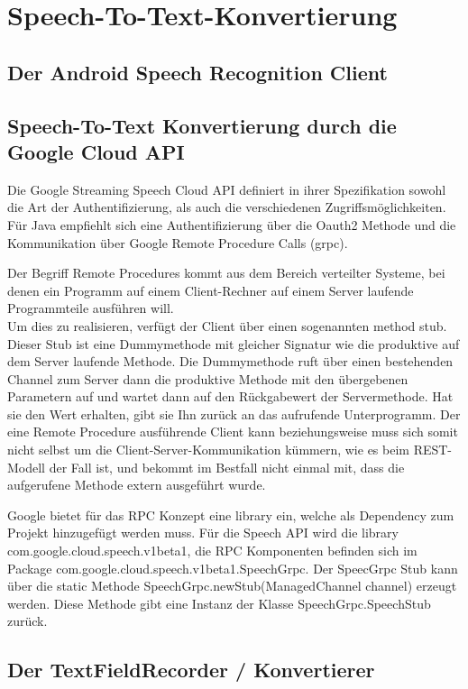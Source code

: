 \chapter{Speech-To-Text-Konvertierung}
\section{Der Android Speech Recognition Client}
\section{Speech-To-Text Konvertierung durch die Google Cloud API}
Die Google Streaming Speech Cloud API definiert in ihrer Spezifikation sowohl die Art der Authentifizierung, als auch die verschiedenen Zugriffsmöglichkeiten. Für Java empfiehlt sich eine Authentifizierung über die Oauth2 Methode und die Kommunikation über Google Remote Procedure Calls (grpc).\par
 Der Begriff Remote Procedures kommt aus dem Bereich verteilter Systeme, bei denen ein Programm auf einem Client-Rechner auf einem Server laufende Programmteile ausführen will.\\
Um dies zu realisieren, verfügt der Client über einen sogenannten method stub. Dieser Stub ist eine Dummymethode mit gleicher Signatur wie die produktive auf dem Server laufende Methode. Die Dummymethode ruft über einen bestehenden Channel zum Server dann die produktive Methode mit den übergebenen Parametern auf und wartet dann auf den Rückgabewert der Servermethode. Hat sie den Wert erhalten, gibt sie Ihn zurück an das aufrufende Unterprogramm. Der eine Remote Procedure ausführende Client kann beziehungsweise muss sich somit nicht selbst um die Client-Server-Kommunikation kümmern, wie es beim REST-Modell der Fall ist, und bekommt im Bestfall nicht einmal mit, dass die aufgerufene Methode extern ausgeführt wurde.\par
Google bietet für das RPC Konzept eine library ein, welche als Dependency zum Projekt hinzugefügt werden muss. Für die Speech API wird die library com.google.cloud.speech.v1beta1, die RPC Komponenten befinden sich im Package com.google.cloud.speech.v1beta1.SpeechGrpc.
Der SpeecGrpc Stub kann über die static Methode SpeechGrpc.newStub(ManagedChannel channel) erzeugt werden. Diese Methode gibt eine Instanz der Klasse SpeechGrpc.SpeechStub zurück. 



\section{Der TextFieldRecorder / Konvertierer}